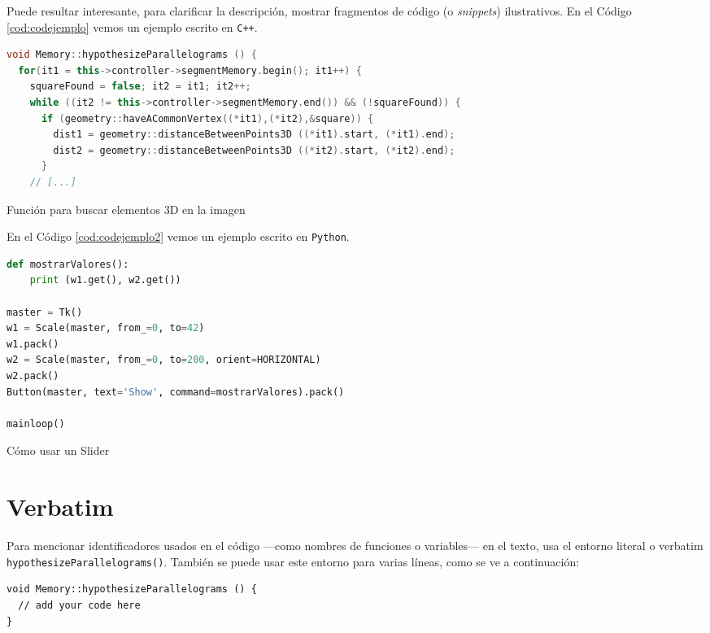 Puede resultar interesante, para clarificar la descripción, mostrar fragmentos de código (o \textit{snippets}) ilustrativos. En el Código \ref{cod:codejemplo} vemos un ejemplo escrito en \texttt{C++}.

\begin{code}[h]
\begin{lstlisting}[language=C++]
void Memory::hypothesizeParallelograms () {
  for(it1 = this->controller->segmentMemory.begin(); it1++) {
    squareFound = false; it2 = it1; it2++;
    while ((it2 != this->controller->segmentMemory.end()) && (!squareFound)) {
      if (geometry::haveACommonVertex((*it1),(*it2),&square)) {
        dist1 = geometry::distanceBetweenPoints3D ((*it1).start, (*it1).end);
        dist2 = geometry::distanceBetweenPoints3D ((*it2).start, (*it2).end);
      }
    // [...]
\end{lstlisting}
\caption[Función para buscar elementos 3D en la imagen]{Función para buscar elementos 3D en la imagen}
\label{cod:codejemplo}
\end{code}

En el Código \ref{cod:codejemplo2} vemos un ejemplo escrito en \texttt{Python}.

\begin{code}[h]
\begin{lstlisting}[language=Python]
def mostrarValores():
    print (w1.get(), w2.get())

master = Tk()
w1 = Scale(master, from_=0, to=42)
w1.pack()
w2 = Scale(master, from_=0, to=200, orient=HORIZONTAL)
w2.pack()
Button(master, text='Show', command=mostrarValores).pack()

mainloop()
\end{lstlisting}
\caption[Cómo usar un Slider]{Cómo usar un Slider}
\label{cod:codejemplo2}
\end{code}

\section{Verbatim}

Para mencionar identificadores usados en el código ---como nombres de funciones o variables--- en el texto, usa el entorno literal o verbatim \verb|hypothesizeParallelograms()|. También se puede usar este entorno para varias líneas, como se ve a continuación:

\begin{verbatim}
void Memory::hypothesizeParallelograms () {
  // add your code here
}
\end{verbatim}


